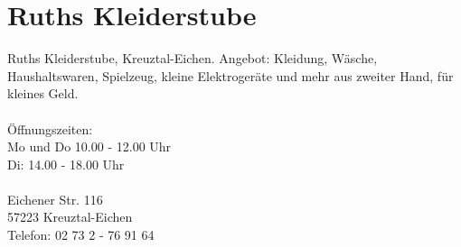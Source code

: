 \section{Ruths Kleiderstube}
Ruths Kleiderstube, Kreuztal-Eichen. Angebot: Kleidung, Wäsche, Haushaltswaren, Spielzeug, kleine Elektrogeräte und mehr aus zweiter Hand, für kleines Geld. \\
\\
Öffnungszeiten: \\
Mo und Do 10.00 - 12.00 Uhr \\
Di: 14.00 - 18.00 Uhr \\
\\
Eichener Str. 116 \\
57223 Kreuztal-Eichen\\
Telefon: 02 73 2 - 76 91 64\\ 